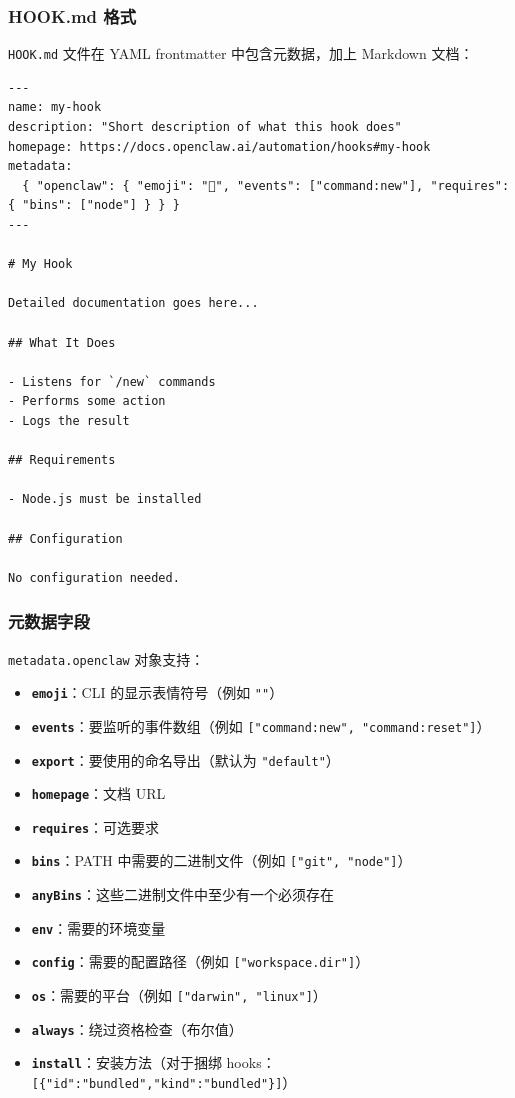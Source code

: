 \subsubsection{HOOK.md 格式}


\texttt{HOOK.md} 文件在 YAML frontmatter 中包含元数据，加上 Markdown 文档：

\begin{lstlisting}
---
name: my-hook
description: "Short description of what this hook does"
homepage: https://docs.openclaw.ai/automation/hooks#my-hook
metadata:
  { "openclaw": { "emoji": "🔗", "events": ["command:new"], "requires": { "bins": ["node"] } } }
---

# My Hook

Detailed documentation goes here...

## What It Does

- Listens for `/new` commands
- Performs some action
- Logs the result

## Requirements

- Node.js must be installed

## Configuration

No configuration needed.
\end{lstlisting}


\subsubsection{元数据字段}


\texttt{metadata.openclaw} 对象支持：

\begin{itemize}
  \item \textbf{\texttt{emoji}}：CLI 的显示表情符号（例如 \texttt{""}）
  \item \textbf{\texttt{events}}：要监听的事件数组（例如 \texttt{["command:new", "command:reset"]}）
  \item \textbf{\texttt{export}}：要使用的命名导出（默认为 \texttt{"default"}）
  \item \textbf{\texttt{homepage}}：文档 URL
  \item \textbf{\texttt{requires}}：可选要求
  \item \textbf{\texttt{bins}}：PATH 中需要的二进制文件（例如 \texttt{["git", "node"]}）
  \item \textbf{\texttt{anyBins}}：这些二进制文件中至少有一个必须存在
  \item \textbf{\texttt{env}}：需要的环境变量
  \item \textbf{\texttt{config}}：需要的配置路径（例如 \texttt{["workspace.dir"]}）
  \item \textbf{\texttt{os}}：需要的平台（例如 \texttt{["darwin", "linux"]}）
  \item \textbf{\texttt{always}}：绕过资格检查（布尔值）
  \item \textbf{\texttt{install}}：安装方法（对于捆绑 hooks：\texttt{[\{"id":"bundled","kind":"bundled"\}]}）
\end{itemize}


